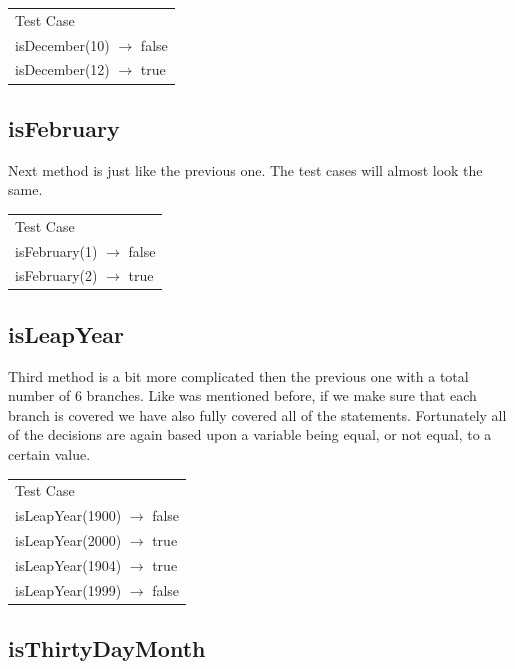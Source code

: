 \documentclass[a4paper]{article}
\begin{document}
\begin{table}[h]
	\begin{tabular}{l}
		Test Case\\
		isDecember(10) $\rightarrow$ false\\
		isDecember(12) $\rightarrow$ true		
	\end{tabular}
\end{table}

\subsection*{isFebruary}

Next method is just like the previous one. The test cases will almost look the same.

\begin{table}[h]
	\begin{tabular}{l}
		Test Case\\
		isFebruary(1) $\rightarrow$ false\\
		isFebruary(2) $\rightarrow$ true		
	\end{tabular}
\end{table}

\subsection*{isLeapYear}

Third method is a bit more complicated then the previous one with a total number of 6 branches. Like was mentioned before, if we make sure that each branch is covered we have also fully covered all of the statements. Fortunately all of the decisions are again based upon a variable being equal, or not equal, to a certain value.

\begin{table}[h]
	\begin{tabular}{l}
		Test Case\\
		isLeapYear(1900) $\rightarrow$ false\\
		isLeapYear(2000) $\rightarrow$ true\\
		isLeapYear(1904) $\rightarrow$ true\\
		isLeapYear(1999) $\rightarrow$ false		
	\end{tabular}
\end{table}

\subsection*{isThirtyDayMonth}
\end{document}
